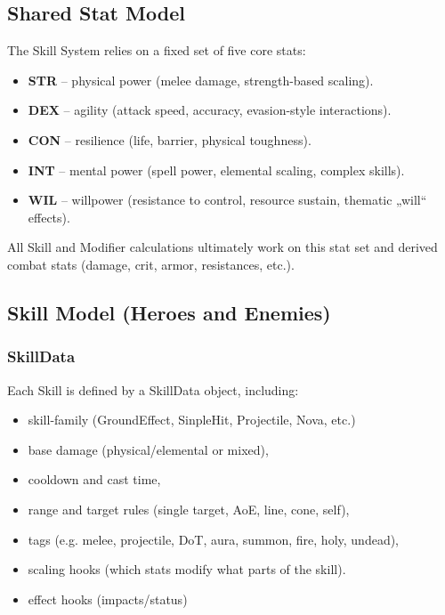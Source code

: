 \subsection{Shared Stat Model}

The Skill System relies on a fixed set of five core stats:

\begin{itemize}
	\item \textbf{STR}  -- physical power (melee damage, strength-based scaling).
	\item \textbf{DEX}  -- agility (attack speed, accuracy, evasion-style interactions).
	\item \textbf{CON}  -- resilience (life, barrier, physical toughness).
	\item \textbf{INT}  -- mental power (spell power, elemental scaling, complex skills).
	\item \textbf{WIL}  -- willpower (resistance to control, resource sustain, thematic „will“ effects).
\end{itemize}

All Skill and Modifier calculations ultimately work on this stat set and derived combat stats (damage, crit, armor, resistances, etc.).


\subsection{Skill Model (Heroes and Enemies)}

\subsubsection*{SkillData}

Each Skill is defined by a SkillData object, including:

\begin{itemize}
	\item skill-family (GroundEffect, SinpleHit, Projectile, Nova, etc.)
	\item base damage (physical/elemental or mixed),
	\item cooldown and cast time,
	\item range and target rules (single target, AoE, line, cone, self),
	\item tags (e.g. melee, projectile, DoT, aura, summon, fire, holy, undead),
	\item scaling hooks (which stats modify what parts of the skill).
	\item effect hooks (impacts/status)
\end{itemize}

